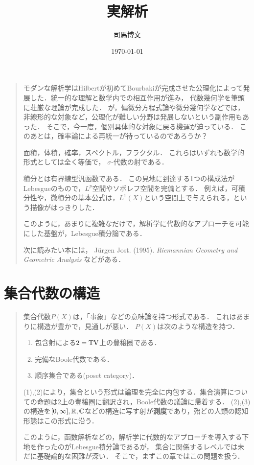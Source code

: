 \documentclass[uplatex, dvipdfmx]{jsreport}
\title{実解析}
\author{司馬博文}
\date{\today}
\begin{document}
\tableofcontents

\begin{quotation}
    モダンな解析学はHilbertが初めてBourbakiが完成させた公理化によって発展した．統一的な理解と数学内での相互作用が進み，
    代数幾何学を筆頭に荘厳な理論が完成した．
    が，偏微分方程式論や微分幾何学などでは，非線形的な対象など，公理化が難しい分野は発展しないという副作用もあった．
    そこで，今一度，個別具体的な対象に戻る機運が迫っている．
    このあとは，確率論による再統一が待っているのであろうか？

    面積，体積，確率，スペクトル，フラクタル．
    これらはいずれも数学的形式としては全く等価で，
    $\sigma$-代数の射である．

    積分とは有界線型汎函数である．
    この見地に到達する1つの構成法がLebesgueのもので，$L^p$空間やソボレフ空間を完備とする．
    例えば，可積分性や，微積分の基本公式は，$L^1(X)$という空間上で与えられる，という描像がはっきりした．

    このように，あまりに複雑なだけで，解析学に代数的なアプローチを可能にした基盤が，Lebesgue積分論である．

    次に読みたい本には，
    Jürgen Jost. (1995). \textit{Riemannian Geometry and Geometric Analysis}
    などがある．
\end{quotation}

\chapter{集合代数の構造}

\begin{quotation}
    集合代数$P(X)$は，「事象」などの意味論を持つ形式である．
    これはあまりに構造が豊かで，見通しが悪い．
    $P(X)$は次のような構造を持つ．
    \begin{enumerate}
        \item 包含射による$2=\mathrm{TV}$上の豊穣圏である．
        \item 完備なBoole代数である．
        \item 順序集合である(poset category)．
    \end{enumerate}
    (1),(2)により，集合という形式は論理を完全に内包する．集合演算についての命題は2上の豊穣圏に翻訳され，Boole代数の議論に帰着する．
    (2),(3)の構造を$[0,\infty],\mathbb{R},\mathbb{C}$などの構造に写す射が\textbf{測度}であり，殆どの人類の認知形態はこの形式に沿う．

    このように，函数解析などの，解析学に代数的なアプローチを導入する下地を作ったのがLebesgue積分論であるが，
    集合に関係するレベルでは未だに基礎論的な困難が深い．
    そこで，まずこの章ではこの問題を扱う．
\end{quotation}
\end{document}
